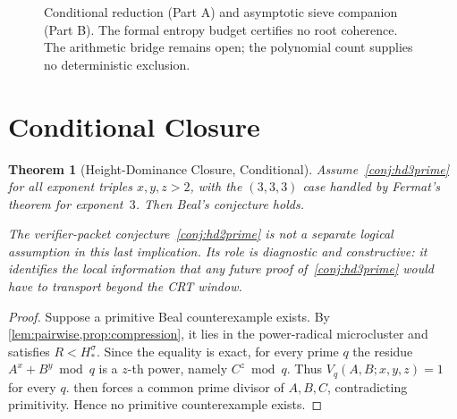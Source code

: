 \documentclass[11pt,a4paper]{article}
\newtheorem{theorem}{Theorem}[section]
\begin{document}
\begin{figure}[htbp]
{}
\caption{Conditional reduction (Part A) and asymptotic sieve companion (Part B). The formal entropy budget certifies no root coherence. The arithmetic bridge remains open; the polynomial count supplies no deterministic exclusion.}
\label{fig:bhd_architecture}
\end{figure}

\section{Conditional Closure}

\begin{theorem}[Height-Dominance Closure, Conditional]
\label{thm:conditional-closure}
Assume~\cref{conj:hd3prime} for all exponent triples $x,y,z>2$, with
the $(3,3,3)$ case handled by Fermat's theorem for exponent~$3$. Then
Beal's conjecture holds.

The verifier-packet conjecture~\cref{conj:hd2prime} is not a separate
logical assumption in this last implication. Its role is diagnostic and
constructive: it identifies the local information that any future proof
of~\cref{conj:hd3prime} would have to transport beyond the CRT window.
\end{theorem}

\begin{proof}
Suppose a primitive Beal counterexample exists. By
\cref{lem:pairwise,prop:compression}, it lies in the power-radical
microcluster and satisfies $R < H_*^{\sigma}$. Since the equality is
exact, for every prime $q$ the residue $A^x+B^y \bmod q$ is a $z$-th
power, namely $C^z \bmod q$. Thus $V_q(A,B;x,y,z)=1$ for every $q$.
 then forces a common prime divisor of $A,B,C$,
contradicting primitivity. Hence no primitive counterexample exists.
\end{proof}
\end{document}
